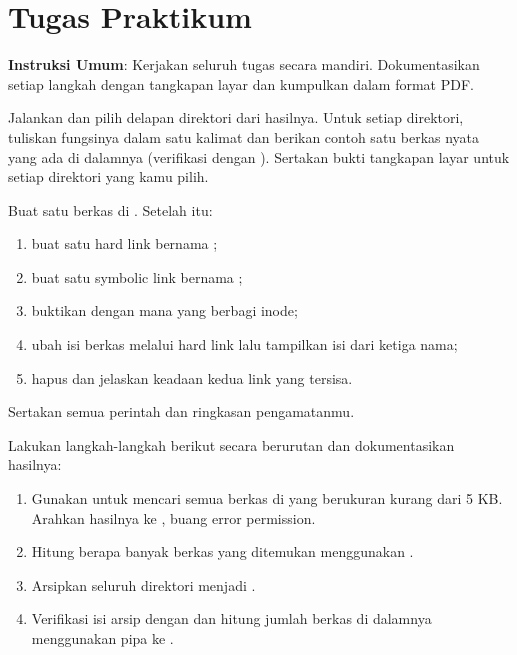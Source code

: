 \section{Tugas Praktikum}
\label{sec:exercises-filesystem}

\textbf{Instruksi Umum}: Kerjakan seluruh tugas secara mandiri. Dokumentasikan setiap
langkah dengan tangkapan layar dan kumpulkan dalam format PDF.

\begin{exercisebox}
Jalankan  dan pilih delapan direktori dari hasilnya. Untuk setiap direktori,
tuliskan fungsinya dalam satu kalimat dan berikan contoh satu berkas nyata yang ada di
dalamnya (verifikasi dengan ). Sertakan bukti tangkapan layar untuk setiap
direktori yang kamu pilih.
\end{exercisebox}

\begin{exercisebox}
Buat satu berkas  di . Setelah itu:
\begin{enumerate}
    \item buat satu hard link bernama ;
    \item buat satu symbolic link bernama ;
    \item buktikan dengan  mana yang berbagi inode;
    \item ubah isi berkas melalui hard link lalu tampilkan isi dari ketiga nama;
    \item hapus  dan jelaskan keadaan kedua link yang tersisa.
\end{enumerate}
Sertakan semua perintah dan ringkasan pengamatanmu.
\end{exercisebox}

\begin{exercisebox}
Lakukan langkah-langkah berikut secara berurutan dan dokumentasikan hasilnya:
\begin{enumerate}
    \item Gunakan  untuk mencari semua berkas  di  yang
    berukuran kurang dari 5 KB. Arahkan hasilnya ke , buang
    error permission.
    \item Hitung berapa banyak berkas yang ditemukan menggunakan .
    \item Arsipkan seluruh direktori  menjadi
    .
    \item Verifikasi isi arsip dengan  dan hitung jumlah berkas di
    dalamnya menggunakan pipa ke .
\end{enumerate}
\end{exercisebox}

